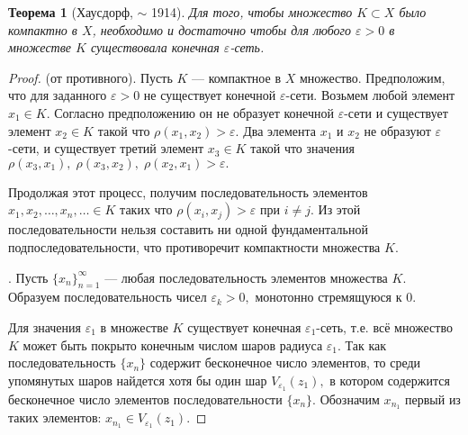 \documentclass[12pt,a4paper,titlepage,oneside]{book}
\theoremstyle{definition}
\theoremstyle{plain}
\newtheorem*{theorem}{Теорема}
\theoremstyle{break}
\theoremstyle{remark}
\theoremstyle{remark}
\theoremstyle{remark}
\theoremstyle{remark}
\theoremstyle{plain}
\theoremstyle{plain}
\begin{document}
\begin{theorem}[Хаусдорф, $\sim$ 1914]
Для того, чтобы множество $K \subset X$ было компактно в $X$, необходимо и достаточно чтобы для любого $\varepsilon > 0$ в множестве $K$ существовала конечная $\varepsilon$-сеть. 
\end{theorem}
\begin{proof}

 (от противного). Пусть $K$  --- компактное в $X$ множество. Предположим, что для заданного $\varepsilon >0 $ не существует конечной $\varepsilon$-сети. Возьмем любой элемент $x_1 \in K.$ Согласно предположению он не образует конечной $\varepsilon$-сети и существует элемент $x_2 \in K$ такой что $\rho(x_1, x_2) > \varepsilon.$ Два элемента $x_1$ и $x_2$ не образуют $\varepsilon$-сети, и существует третий элемент $x_3 \in K$ такой что значения $\rho(x_3, x_1), \; \rho(x_3, x_2), \; \rho(x_2, x_1) > \varepsilon.$

Продолжая этот процесс, получим последовательность элементов $x_1,x_2, \ldots, x_n, \ldots \in K$ таких что $\rho(x_i, x_j) > \varepsilon$ при   $i \neq j$. Из этой последовательности нельзя составить ни одной фундаментальной подпоследовательности, что противоречит компактности множества $K.$

. Пусть $\{x_n\}_{n=1}^{\infty}$ --- любая последовательность элементов множества $K.$ Образуем последовательность чисел $\varepsilon _k > 0,$ монотонно стремящуюся к $0.$

Для значения $\varepsilon _1$  в множестве $K$ существует конечная $\varepsilon _1$-сеть, т.е. всё множество $K$ может быть покрыто конечным числом шаров радиуса $\varepsilon _1 .$ Так как последовательность $\{ x_n \}$ содержит бесконечное число элементов, то среди упомянутых шаров найдется хотя бы один шар $V_{\varepsilon _1} (z_1),$ в котором содержится бесконечное число элементов последовательности $\{x_n\}.$ Обозначим $x_{n_1}$ первый из таких элементов: $x_{n_1} \in V_{\varepsilon _1} (z_1).$


\end{proof}
\end{document}
